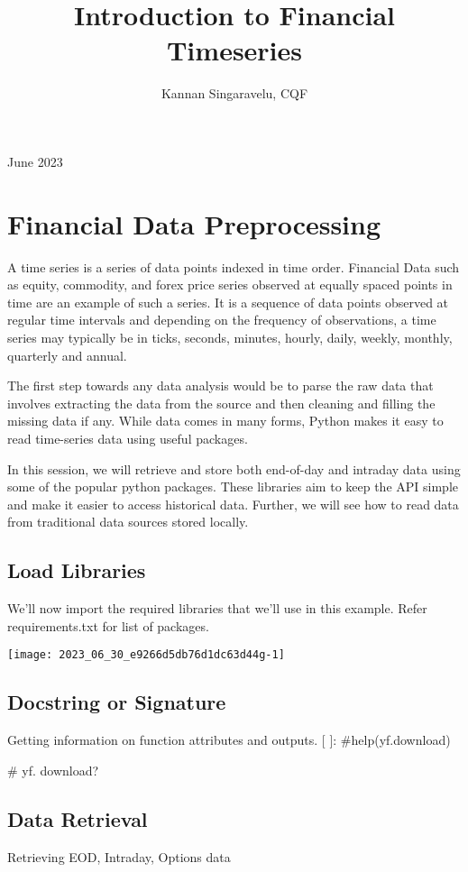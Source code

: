 \documentclass[10pt]{article}
\title{Introduction to Financial Timeseries }
\author{Kannan Singaravelu, CQF}
\date{}
\begin{document}
\maketitle
June 2023

\section*{Financial Data Preprocessing}
A time series is a series of data points indexed in time order. Financial Data such as equity, commodity, and forex price series observed at equally spaced points in time are an example of such a series. It is a sequence of data points observed at regular time intervals and depending on the frequency of observations, a time series may typically be in ticks, seconds, minutes, hourly, daily, weekly, monthly, quarterly and annual.

The first step towards any data analysis would be to parse the raw data that involves extracting the data from the source and then cleaning and filling the missing data if any. While data comes in many forms, Python makes it easy to read time-series data using useful packages.

In this session, we will retrieve and store both end-of-day and intraday data using some of the popular python packages. These libraries aim to keep the API simple and make it easier to access historical data. Further, we will see how to read data from traditional data sources stored locally.

\subsection*{Load Libraries}
We'll now import the required libraries that we'll use in this example. Refer requirements.txt for list of packages.

\begin{center}
\texttt{[image: 2023\_06\_30\_e9266d5db76d1dc63d44g-1]}
\end{center}

\subsection*{Docstring or Signature}
Getting information on function attributes and outputs. [ ]: \#help(yf.download)

\# yf. download?

\subsection*{Data Retrieval}
Retrieving EOD, Intraday, Options data
\end{document}
